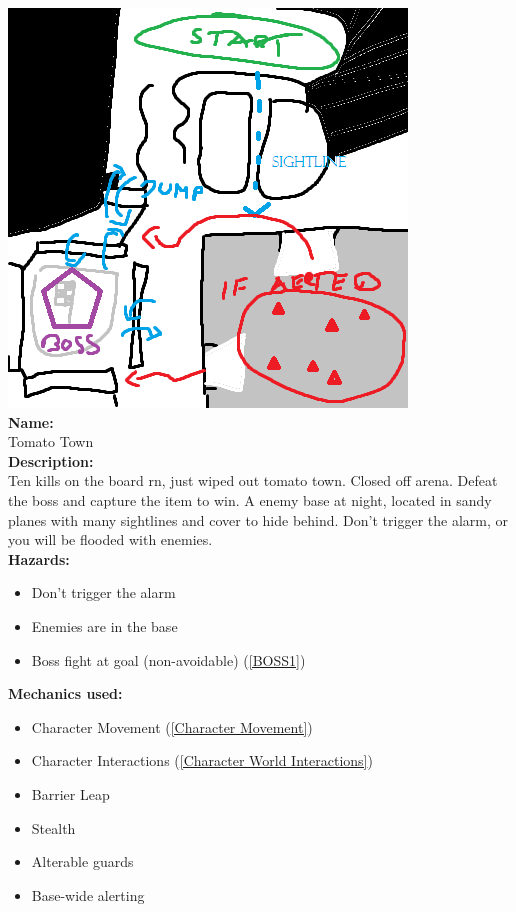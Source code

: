 \documentclass[10pt,a4paper]{article}
\begin{document}
\begin{center}
\includegraphics[scale=0.5]{map}\\

\textbf{Name:}\\
Tomato Town\\

\textbf{Description:}\\
Ten kills on the board rn, just wiped out tomato town.
Closed off arena. Defeat the boss and capture the item to win. A enemy base at night, located in sandy planes with many sightlines and cover to hide behind. Don't trigger the alarm, or you will be flooded with enemies. \\

\textbf{Hazards:}\\
\begin{itemize}
\item Don't trigger the alarm
\item Enemies are in the base
\item Boss fight at goal (non-avoidable) (\ref{BOSS1})
\end{itemize}
\textbf{Mechanics used:}\\
\begin{itemize}
\item Character Movement (\ref{Character Movement})
\item Character Interactions (\ref{Character World Interactions})
\item Barrier Leap
\item Stealth
\item Alterable guards
\item Base-wide alerting
\end{itemize}


\end{center}
\end{document}
